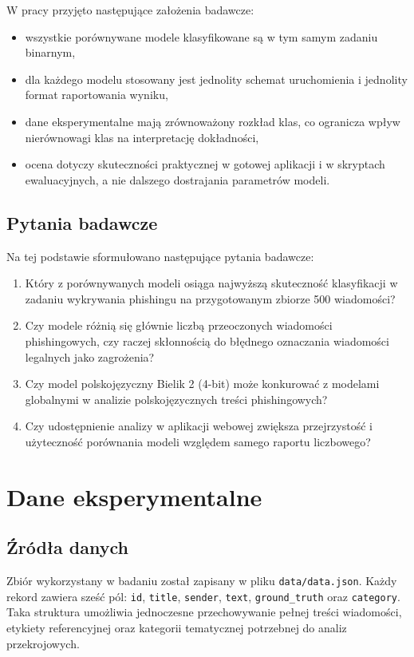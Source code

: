 \documentclass[12pt,a4paper,openany]{report}
\begin{document}
W pracy przyjęto następujące założenia badawcze:

\begin{itemize}
    \item wszystkie porównywane modele klasyfikowane są w tym samym zadaniu binarnym,
    \item dla każdego modelu stosowany jest jednolity schemat uruchomienia i jednolity format raportowania wyniku,
    \item dane eksperymentalne mają zrównoważony rozkład klas, co ogranicza wpływ nierównowagi klas na interpretację dokładności,
    \item ocena dotyczy skuteczności praktycznej w gotowej aplikacji i w skryptach ewaluacyjnych, a nie dalszego dostrajania parametrów modeli.
\end{itemize}

\section{Pytania badawcze}

Na tej podstawie sformułowano następujące pytania badawcze:

\begin{enumerate}
    \item Który z porównywanych modeli osiąga najwyższą skuteczność klasyfikacji w zadaniu wykrywania phishingu na przygotowanym zbiorze 500 wiadomości?
    \item Czy modele różnią się głównie liczbą przeoczonych wiadomości phishingowych, czy raczej skłonnością do błędnego oznaczania wiadomości legalnych jako zagrożenia?
    \item Czy model polskojęzyczny Bielik 2 (4-bit) może konkurować z modelami globalnymi w analizie polskojęzycznych treści phishingowych?
    \item Czy udostępnienie analizy w aplikacji webowej zwiększa przejrzystość i użyteczność porównania modeli względem samego raportu liczbowego?
\end{enumerate}

\chapter{Dane eksperymentalne}

\section{Źródła danych}

Zbiór wykorzystany w badaniu został zapisany w pliku \texttt{data/data.json}. Każdy rekord zawiera sześć pól: \texttt{id}, \texttt{title}, \texttt{sender}, \texttt{text}, \texttt{ground\_truth} oraz \texttt{category}. Taka struktura umożliwia jednoczesne przechowywanie pełnej treści wiadomości, etykiety referencyjnej oraz kategorii tematycznej potrzebnej do analiz przekrojowych.
\end{document}
